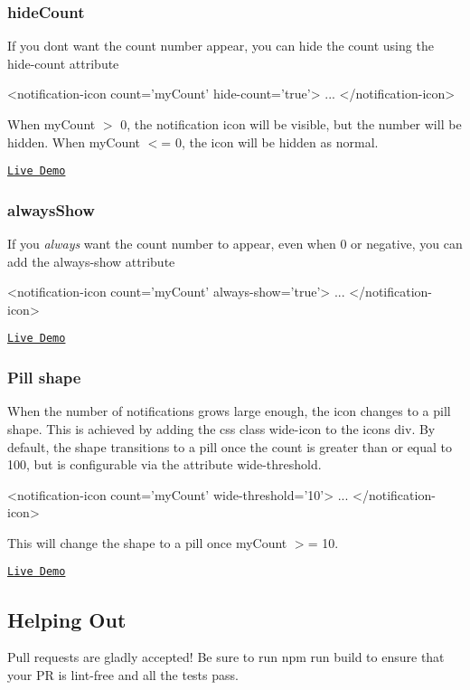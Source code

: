 \subsubsection*{hide\+Count}

If you don\textquotesingle{}t want the count number appear, you can hide the count using the \textquotesingle{}hide-\/count\textquotesingle{} attribute 
\begin{DoxyCode}
<notification-icon count='myCount' hide-count='true'>
    ...
</notification-icon>
\end{DoxyCode}
 When my\+Count $>$ 0, the notification icon will be visible, but the number will be hidden. When my\+Count $<$= 0, the icon will be hidden as normal.

\href{http://jemonjam.com/angular-notification-icons#hide-count}{\tt Live Demo}

\subsubsection*{always\+Show}

If you {\itshape always} want the count number to appear, even when 0 or negative, you can add the \textquotesingle{}always-\/show\textquotesingle{} attribute 
\begin{DoxyCode}
<notification-icon count='myCount' always-show='true'>
  ...
</notification-icon>
\end{DoxyCode}


\href{http://jemonjam.com/angular-notification-icons#always-show}{\tt Live Demo}

\subsubsection*{Pill shape}

When the number of notifications grows large enough, the icon changes to a pill shape. This is achieved by adding the css class wide-\/icon to the icon\textquotesingle{}s div. By default, the shape transitions to a pill once the count is greater than or equal to 100, but is configurable via the attribute \textquotesingle{}wide-\/threshold\textquotesingle{}. 
\begin{DoxyCode}
<notification-icon count='myCount' wide-threshold='10'>
    ...
</notification-icon>
\end{DoxyCode}
 This will change the shape to a pill once my\+Count $>$= 10.

\href{http://jemonjam.com/angular-notification-icons#pill}{\tt Live Demo}

\subsection*{Helping Out}

Pull requests are gladly accepted! Be sure to run {\ttfamily npm run build} to ensure that your PR is lint-\/free and all the tests pass. 